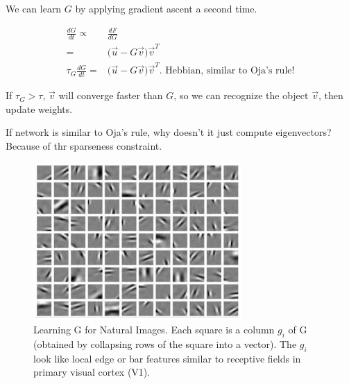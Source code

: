 \documentclass[]{article}
\begin{document}
We can learn $G$ by applying gradient ascent a second time.

\begin{align*}
	\frac{dG}{dt} \propto& \frac{dF}{dG}\\
	=& \big(\vec{u}-G\vec{v}\big) \vec{v}^T\\
	\tau_G \frac{dG}{dt} =& \big(\vec{u}-G\vec{v}\big) \vec{v}^T \text{. Hebbian, similar to Oja's rule!}
\end{align*}

If $\tau_G>\tau$, $\vec{v}$ will converge faster than $G$, so we can recognize the object $\vec{v}$, then update weights.

If network is similar to Oja's rule, why doesn't it just compute eigenvectors? Because of thr sparseness constraint.
\begin{figure}[H]
	\begin{center}
		\caption[Learning G for Natural Images]{Learning G for Natural Images. Each square is a column $g_i$ of G (obtained by collapsing rows of the square into a vector).	The $g_i$  look like local edge or bar features similar to receptive fields in primary visual cortex (V1)\cite{olshausen1997sparse}.}
		\includegraphics[width=\textwidth]{learning-G-natural}
	\end{center}
\end{figure}
\end{document}

